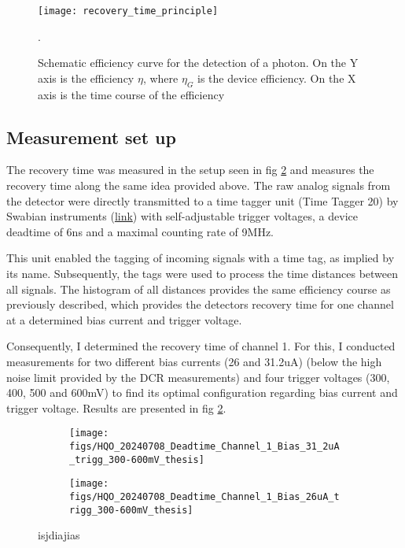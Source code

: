 \begin{figure}[H]
 \centering
 \texttt{[image: recovery\_time\_principle]}
 \caption{Schematic efficiency curve for the detection of a photon\cite{shalm_single-photon_2013}. On the Y axis is the
 efficiency $\eta$, where $\eta_{G}$ is the device efficiency. On the X axis is the time course of the efficiency}.
 \label{fig:Recovery_time}
\end{figure}

\subsection*{Measurement set up}
The recovery time was measured in the setup seen in fig \ref{fig: recovery_time_measurement_31_2_and_26uA} and measures the recovery time
along the same idea provided above.
The raw analog signals from the detector were directly transmitted to a time tagger unit (Time Tagger 20)
by Swabian instruments (\href{https://www.swabianinstruments.com/time-tagger/}{link})
with self-adjustable trigger voltages, a device deadtime of 6ns and a maximal counting rate of 9MHz.

This unit enabled the tagging of incoming signals with a time tag, as implied by its name.
Subsequently, the tags were used to process the time distances between all signals.
The histogram of all distances provides the same efficiency course as previously described,
which provides the detectors recovery time for one channel at a determined bias current and trigger voltage.

Consequently, I determined the recovery time of channel 1.
For this, I conducted measurements for two different bias currents (26 and 31.2uA)
(below the high noise limit provided by the DCR measurements) and four trigger voltages (300, 400, 500 and 600mV) to find
its optimal configuration regarding bias current and trigger voltage.
Results are presented in fig \ref{fig: recovery_time_measurement_31_2_and_26uA}.

\begin{figure}[H]
  \begin{subfigure}[t]{.5\textwidth}
    \centering
    \texttt{[image: figs/HQO\_20240708\_Deadtime\_Channel\_1\_Bias\_31\_2uA\_trigg\_300-600mV\_thesis]}
  \end{subfigure}
  \hfill
  \begin{subfigure}[t]{.5\textwidth}
    \centering
    \texttt{[image: figs/HQO\_20240708\_Deadtime\_Channel\_1\_Bias\_26uA\_trigg\_300-600mV\_thesis]}
  \end{subfigure}
  \caption{isjdiajias}
  \label{fig: recovery_time_measurement_31_2_and_26uA}
\end{figure}

